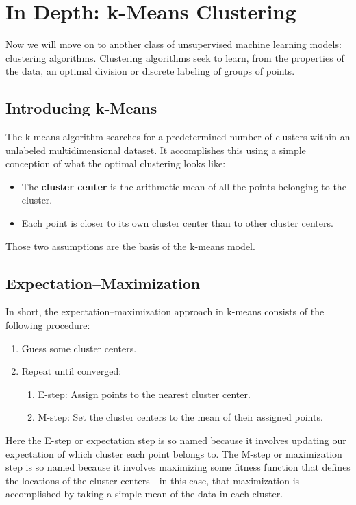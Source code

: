 \chapter{In Depth: k-Means Clustering\label{Ch47}}
Now we will move on to another class of unsupervised
machine learning models: clustering algorithms. Clustering algorithms seek to learn,
from the properties of the data, an optimal division or discrete labeling of groups of
points.
\section{Introducing k-Means}
The k-means algorithm searches for a predetermined number of clusters within an
unlabeled multidimensional dataset. It accomplishes this using a simple conception of
what the optimal clustering looks like:
\begin{itemize}
    \item The \textbf{cluster center} is the arithmetic mean of all the points belonging to the cluster.
    \item Each point is closer to its own cluster center than to other cluster centers.
\end{itemize}
Those two assumptions are the basis of the k-means model.

\section{Expectation–Maximization}
In short,
the expectation–maximization approach in k-means consists of the following procedure:
\begin{enumerate}
    \item Guess some cluster centers.
    \item Repeat until converged:
          \begin{enumerate}
              \item E-step: Assign points to the nearest cluster center.
              \item M-step: Set the cluster centers to the mean of their assigned points.
          \end{enumerate}
\end{enumerate}
Here the E-step or expectation step is so named because it involves updating our
expectation of which cluster each point belongs to. The M-step or maximization step
is so named because it involves maximizing some fitness function that defines the
locations of the cluster centers—in this case, that maximization is accomplished by
taking a simple mean of the data in each cluster.

